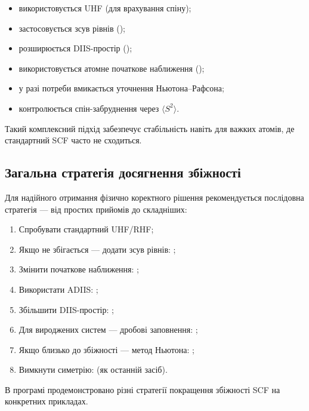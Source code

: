 \begin{itemize}
  \item використовується UHF (для врахування спіну);
  \item застосовується зсув рівнів ();
  \item розширюється DIIS-простір ();
  \item використовується атомне початкове наближення ();
  \item у разі потреби вмикається уточнення Ньютона--Рафсона;
  \item контролюється спін-забруднення через $\langle S^2 \rangle$.
\end{itemize}

Такий комплексний підхід забезпечує стабільність навіть для важких атомів, де стандартний SCF часто не сходиться.

\subsection{Загальна стратегія досягнення збіжності}

Для надійного отримання фізично коректного рішення рекомендується послідовна стратегія --- від простих прийомів до складніших:

\begin{enumerate}
  \item Спробувати стандартний UHF/RHF;
  \item Якщо не збігається --- додати зсув рівнів: ;
  \item Змінити початкове наближення: ;
  \item Використати ADIIS: ;
  \item Збільшити DIIS-простір: ;
  \item Для вироджених систем --- дробові заповнення: ;
  \item Якщо близько до збіжності --- метод Ньютона: ;
  \item Вимкнути симетрію:  (як останній засіб).
\end{enumerate}

В програмі  продемонстровано різні стратегії покращення збіжності SCF на конкретних прикладах.

